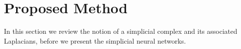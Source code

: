 \section{Proposed Method}

In this section we review the notion of a simplicial complex and its associated Laplacians, before we present the simplicial neural networks. 




